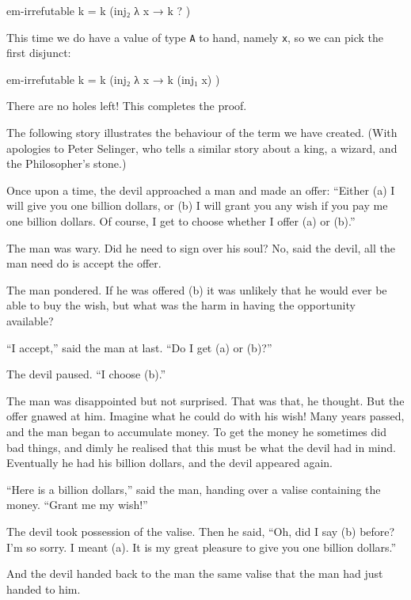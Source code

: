 \begin{myDisplay}
em-irrefutable k = k (inj₂ λ{ x → k ? })
\end{myDisplay}

This time we do have a value of type \texttt{A} to hand, namely
\texttt{x}, so we can pick the first disjunct:

\begin{myDisplay}
em-irrefutable k = k (inj₂ λ{ x → k (inj₁ x) })
\end{myDisplay}

There are no holes left! This completes the proof.

The following story illustrates the behaviour of the term we have
created. (With apologies to Peter Selinger, who tells a similar story
about a king, a wizard, and the Philosopher's stone.)

Once upon a time, the devil approached a man and made an offer: ``Either
(a) I will give you one billion dollars, or (b) I will grant you any
wish if you pay me one billion dollars. Of course, I get to choose
whether I offer (a) or (b).''

The man was wary. Did he need to sign over his soul? No, said the devil,
all the man need do is accept the offer.

The man pondered. If he was offered (b) it was unlikely that he would
ever be able to buy the wish, but what was the harm in having the
opportunity available?

``I accept,'' said the man at last. ``Do I get (a) or (b)?''

The devil paused. ``I choose (b).''

The man was disappointed but not surprised. That was that, he thought.
But the offer gnawed at him. Imagine what he could do with his wish!
Many years passed, and the man began to accumulate money. To get the
money he sometimes did bad things, and dimly he realised that this must
be what the devil had in mind. Eventually he had his billion dollars,
and the devil appeared again.

``Here is a billion dollars,'' said the man, handing over a valise
containing the money. ``Grant me my wish!''

The devil took possession of the valise. Then he said, ``Oh, did I say
(b) before? I'm so sorry. I meant (a). It is my great pleasure to give
you one billion dollars.''

And the devil handed back to the man the same valise that the man had
just handed to him.


